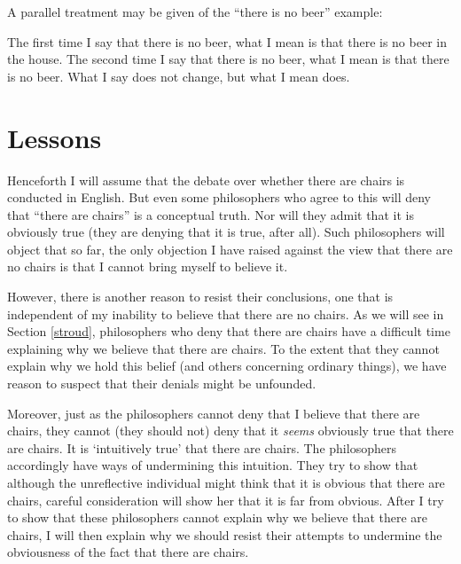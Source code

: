 \documentclass[11pt]{article}
\begin{document}
\begin{spacing}{1.25}



A parallel treatment may be given of the ``there is no beer'' example:




The first time I say that there is no beer, what I mean is that there
is no beer in the house.  The second time I say that there is no beer,
what I mean is that there is no beer.  What I say does not change, but
what I mean does.

\section{Lessons}
\label{lessons-verb}
Henceforth I will assume that the debate over whether there are chairs
is conducted in English.  But even some philosophers who agree to this
will deny that ``there are chairs'' is a conceptual truth.  Nor will
they admit that it is obviously true (they are denying that it is
true, after all).  Such philosophers will object that so far, the only
objection I have raised against the view that there are no chairs is
that I cannot bring myself to believe it.

However, there is another reason to resist their conclusions, one that
is independent of my inability to believe that there are no chairs.
As we will see in Section \ref{stroud}, philosophers who deny that
there are chairs have a difficult time explaining why we believe that
there are chairs.  To the extent that they cannot explain why we hold
this belief (and others concerning ordinary things), we have reason to
suspect that their denials might be unfounded.

Moreover, just as the philosophers cannot deny that I believe that
there are chairs, they cannot (they should not) deny that it {\em
  seems} obviously true that there are chairs.  It is `intuitively
true' that there are chairs.  The philosophers accordingly have ways
of undermining this intuition.  They try to show that although the
unreflective individual might think that it is obvious that there are
chairs, careful consideration will show her that it is far from
obvious.  After I try to show that these philosophers cannot explain
why we believe that there are chairs, I will then explain why we
should resist their attempts to undermine the obviousness of the fact
that there are chairs.

\ifstandalone
\end{spacing}


\fi
\end{document}
